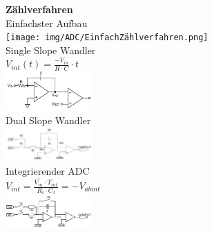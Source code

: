 \documentclass[margin=normal]{tex/hsrzf}
\begin{document}
\begin{multicols}{3}
  \begin{minipage}{0.29\textwidth}
    \textbf{Zählverfahren}
    \\ Einfachster Aufbau
    \\\texttt{[image: img/ADC/EinfachZählverfahren.png]}
    \\ Single Slope Wandler
    \\ $V_{int}(t) = \frac{-V_{in}}{R\cdot C}\cdot t$
    \\\includegraphics[width=0.25\textwidth]{img/ADC/SingleSlopeWandler.png}
    \\ Dual Slope Wandler
    \\\includegraphics[width=0.25\textwidth]{img/ADC/DualSlopeWandler.png}
    \\ Integrierender ADC
    \\ $V_{int} = \frac{\bar{V_{in}}\cdot T_{int}}{R_i \cdot C_i} = -V_{abint}$
    \\\includegraphics[width=0.25\textwidth]{img/ADC/IntegrierenderADC.png}
  \end{minipage}
\end{multicols}
\end{document}

